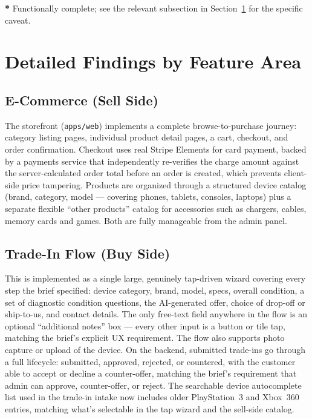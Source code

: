 \documentclass[11pt,a4paper]{article}
\begin{document}
{\small\color{GrayText}\textbf{*} Functionally complete; see the relevant subsection in Section~\ref{sec:findings} for the specific caveat.}

\newpage

\section{Detailed Findings by Feature Area}
\label{sec:findings}

\subsection{E-Commerce (Sell Side)}

The storefront (\texttt{apps/web}) implements a complete browse-to-purchase journey: category listing pages, individual product detail pages, a cart, checkout, and order confirmation. Checkout uses real Stripe Elements for card payment, backed by a payments service that independently re-verifies the charge amount against the server-calculated order total before an order is created, which prevents client-side price tampering. Products are organized through a structured device catalog (brand, category, model --- covering phones, tablets, consoles, laptops) plus a separate flexible ``other products'' catalog for accessories such as chargers, cables, memory cards and games. Both are fully manageable from the admin panel.

\subsection{Trade-In Flow (Buy Side)}

This is implemented as a single large, genuinely tap-driven wizard covering every step the brief specified: device category, brand, model, specs, overall condition, a set of diagnostic condition questions, the AI-generated offer, choice of drop-off or ship-to-us, and contact details. The only free-text field anywhere in the flow is an optional ``additional notes'' box --- every other input is a button or tile tap, matching the brief's explicit UX requirement. The flow also supports photo capture or upload of the device. On the backend, submitted trade-ins go through a full lifecycle: submitted, approved, rejected, or countered, with the customer able to accept or decline a counter-offer, matching the brief's requirement that admin can approve, counter-offer, or reject. The searchable device autocomplete list used in the trade-in intake now includes older PlayStation~3 and Xbox~360 entries, matching what's selectable in the tap wizard and the sell-side catalog.
\end{document}
